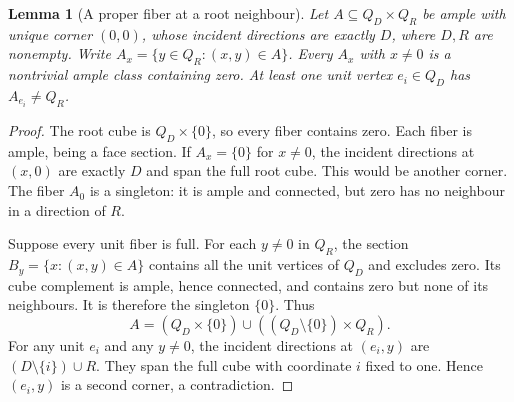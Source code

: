 \documentclass[11pt]{article}
\numberwithin{equation}{section}
\newtheorem{lemma}[theorem]{Lemma}
\theoremstyle{definition}
\theoremstyle{remark}
\begin{document}
\begin{lemma}[A proper fiber at a root neighbour]
\label{lem:unique-corner-proper-fiber}
Let $A\subseteq Q_D\times Q_R$ be ample with unique corner $(0,0)$,
whose incident directions are exactly $D$, where $D,R$ are nonempty.
Write $A_x=\{y\in Q_R:(x,y)\in A\}$. Every $A_x$ with
$x\ne0$ is a nontrivial ample class containing zero. At least one
unit vertex $e_i\in Q_D$ has $A_{e_i}\ne Q_R$.
\end{lemma}
\begin{proof}
The root cube is $Q_D\times\{0\}$, so every fiber contains zero.
Each fiber is ample, being a face section. If $A_x=\{0\}$ for
$x\ne0$, the incident directions at $(x,0)$ are exactly $D$ and
span the full root cube. This would be another corner.
The fiber $A_0$ is a singleton: it is ample and connected, but zero
has no neighbour in a direction of $R$.

Suppose every unit fiber is full. For each $y\ne0$ in $Q_R$, the
section $B_y=\{x:(x,y)\in A\}$ contains all the unit vertices
of $Q_D$ and excludes zero. Its cube complement is ample, hence
connected, and contains zero but none of its neighbours. It is
therefore the singleton $\{0\}$. Thus
\[
 A=(Q_D\times\{0\})\cup((Q_D\setminus\{0\})\times Q_R).
\]
For any unit $e_i$ and any $y\ne0$, the incident directions at
$(e_i,y)$ are $(D\setminus\{i\})\cup R$. They span the full cube
with coordinate $i$ fixed to one. Hence $(e_i,y)$ is a second
corner, a contradiction.
\end{proof}
\end{document}

